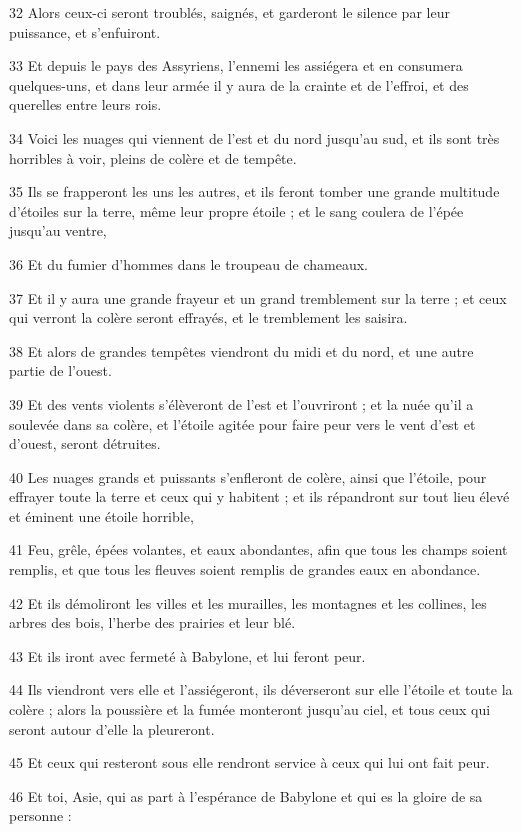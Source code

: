 \par 32 Alors ceux-ci seront troublés, saignés, et garderont le silence par leur puissance, et s'enfuiront.
\par 33 Et depuis le pays des Assyriens, l'ennemi les assiégera et en consumera quelques-uns, et dans leur armée il y aura de la crainte et de l'effroi, et des querelles entre leurs rois.
\par 34 Voici les nuages ​​qui viennent de l'est et du nord jusqu'au sud, et ils sont très horribles à voir, pleins de colère et de tempête.
\par 35 Ils se frapperont les uns les autres, et ils feront tomber une grande multitude d'étoiles sur la terre, même leur propre étoile ; et le sang coulera de l'épée jusqu'au ventre,
\par 36 Et du fumier d'hommes dans le troupeau de chameaux.
\par 37 Et il y aura une grande frayeur et un grand tremblement sur la terre ; et ceux qui verront la colère seront effrayés, et le tremblement les saisira.
\par 38 Et alors de grandes tempêtes viendront du midi et du nord, et une autre partie de l'ouest.
\par 39 Et des vents violents s'élèveront de l'est et l'ouvriront ; et la nuée qu'il a soulevée dans sa colère, et l'étoile agitée pour faire peur vers le vent d'est et d'ouest, seront détruites.
\par 40 Les nuages ​​grands et puissants s'enfleront de colère, ainsi que l'étoile, pour effrayer toute la terre et ceux qui y habitent ; et ils répandront sur tout lieu élevé et éminent une étoile horrible,
\par 41 Feu, grêle, épées volantes, et eaux abondantes, afin que tous les champs soient remplis, et que tous les fleuves soient remplis de grandes eaux en abondance.
\par 42 Et ils démoliront les villes et les murailles, les montagnes et les collines, les arbres des bois, l'herbe des prairies et leur blé.
\par 43 Et ils iront avec fermeté à Babylone, et lui feront peur.
\par 44 Ils viendront vers elle et l'assiégeront, ils déverseront sur elle l'étoile et toute la colère ; alors la poussière et la fumée monteront jusqu'au ciel, et tous ceux qui seront autour d'elle la pleureront.
\par 45 Et ceux qui resteront sous elle rendront service à ceux qui lui ont fait peur.
\par 46 Et toi, Asie, qui as part à l'espérance de Babylone et qui es la gloire de sa personne :
